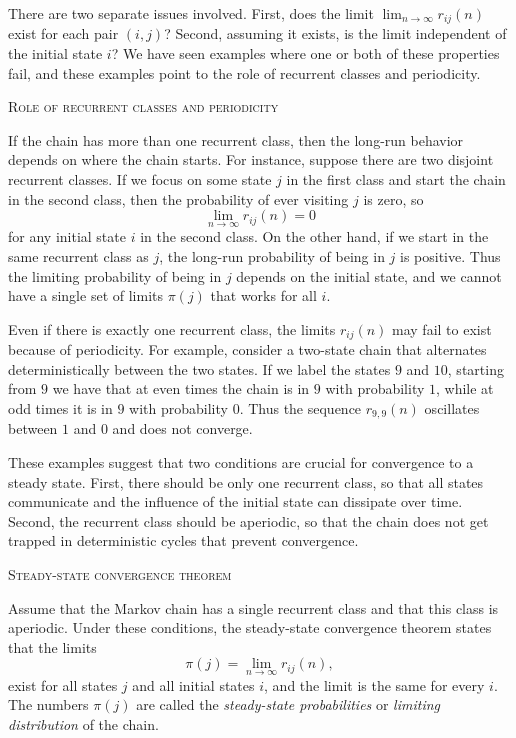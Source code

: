There are two separate issues involved.
First, does the limit \(\lim_{n \to \infty} r_{ij}(n)\) exist for each pair \((i,j)\)?
Second, assuming it exists, is the limit independent of the initial state \(i\)?
We have seen examples where one or both of these properties fail, and these examples point to the role of recurrent classes and periodicity.

\bigskip
\textsc{Role of recurrent classes and periodicity}

If the chain has more than one recurrent class, then the long-run behavior depends on where the chain starts.
For instance, suppose there are two disjoint recurrent classes.
If we focus on some state \(j\) in the first class and start the chain in the second class, then the probability of ever visiting \(j\) is zero, so
\[
\lim_{n \to \infty} r_{ij}(n) = 0
\]
for any initial state \(i\) in the second class.
On the other hand, if we start in the same recurrent class as \(j\), the long-run probability of being in \(j\) is positive.
Thus the limiting probability of being in \(j\) depends on the initial state, and we cannot have a single set of limits \(\pi(j)\) that works for all \(i\).

Even if there is exactly one recurrent class, the limits \(r_{ij}(n)\) may fail to exist because of periodicity.
For example, consider a two-state chain that alternates deterministically between the two states.
If we label the states \(9\) and \(10\), starting from \(9\) we have that at even times the chain is in \(9\) with probability \(1\), while at odd times it is in \(9\) with probability \(0\).
Thus the sequence \(r_{9,9}(n)\) oscillates between \(1\) and \(0\) and does not converge.

These examples suggest that two conditions are crucial for convergence to a steady state.
First, there should be only one recurrent class, so that all states communicate and the influence of the initial state can dissipate over time.
Second, the recurrent class should be aperiodic, so that the chain does not get trapped in deterministic cycles that prevent convergence.

\bigskip
\textsc{Steady-state convergence theorem}

Assume that the Markov chain has a single recurrent class and that this class is aperiodic.
Under these conditions, the steady-state convergence theorem states that the limits
\[
\pi(j)
=
\lim_{n \to \infty} r_{ij}(n),
\]
exist for all states \(j\) and all initial states \(i\), and the limit is the same for every \(i\).
The numbers \(\pi(j)\) are called the \textit{steady-state probabilities} or \textit{limiting distribution} of the chain.


